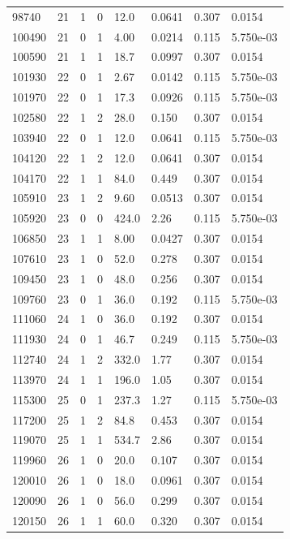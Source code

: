 \documentclass[preview]{standalone}
\begin{document}
{{{{\begin{tabular}{L{1.2cm}C{1.2cm} C{0.3cm}C{0.5cm} C{1.4cm}C{1.4cm} C{1.4cm}C{1.4cm}}
  98740  &    21  & 1     &  0 &  12.0  & 0.0641  & 0.307 &  0.0154   \\ 
  100490  &    21  & 0     &  1 &  4.00  & 0.0214  & 0.115 &  5.750e-03   \\ 
  100590  &    21  & 1     &  1 &  18.7  & 0.0997  & 0.307 &  0.0154   \\ 
  101930  &    22  & 0     &  1 &  2.67  & 0.0142  & 0.115 &  5.750e-03   \\ 
  101970  &    22  & 0     &  1 &  17.3  & 0.0926  & 0.115 &  5.750e-03   \\ 
  102580  &    22  & 1     &  2 &  28.0  & 0.150  & 0.307 &  0.0154   \\ 
  103940  &    22  & 0     &  1 &  12.0  & 0.0641  & 0.115 &  5.750e-03   \\ 
  104120  &    22  & 1     &  2 &  12.0  & 0.0641  & 0.307 &  0.0154   \\ 
  104170  &    22  & 1     &  1 &  84.0  & 0.449  & 0.307 &  0.0154   \\ 
  105910  &    23  & 1     &  2 &  9.60  & 0.0513  & 0.307 &  0.0154   \\ 
  105920  &    23  & 0     &  0 &  424.0  & 2.26  & 0.115 &  5.750e-03   \\ 
  106850  &    23  & 1     &  1 &  8.00  & 0.0427  & 0.307 &  0.0154   \\ 
  107610  &    23  & 1     &  0 &  52.0  & 0.278  & 0.307 &  0.0154   \\ 
  109450  &    23  & 1     &  0 &  48.0  & 0.256  & 0.307 &  0.0154   \\ 
  109760  &    23  & 0     &  1 &  36.0  & 0.192  & 0.115 &  5.750e-03   \\ 
  111060  &    24  & 1     &  0 &  36.0  & 0.192  & 0.307 &  0.0154   \\ 
  111930  &    24  & 0     &  1 &  46.7  & 0.249  & 0.115 &  5.750e-03   \\ 
  112740  &    24  & 1     &  2 &  332.0  & 1.77  & 0.307 &  0.0154   \\ 
  113970  &    24  & 1     &  1 &  196.0  & 1.05  & 0.307 &  0.0154   \\ 
  115300  &    25  & 0     &  1 &  237.3  & 1.27  & 0.115 &  5.750e-03   \\ 
  117200  &    25  & 1     &  2 &  84.8  & 0.453  & 0.307 &  0.0154   \\ 
  119070  &    25  & 1     &  1 &  534.7  & 2.86  & 0.307 &  0.0154   \\ 
  119960  &    26  & 1     &  0 &  20.0  & 0.107  & 0.307 &  0.0154   \\ 
  120010  &    26  & 1     &  0 &  18.0  & 0.0961  & 0.307 &  0.0154   \\ 
  120090  &    26  & 1     &  0 &  56.0  & 0.299  & 0.307 &  0.0154   \\ 
  120150  &    26  & 1     &  1 &  60.0  & 0.320  & 0.307 &  0.0154   \\ 
\hline 
\end{tabular} 

}}}}
\end{document}
